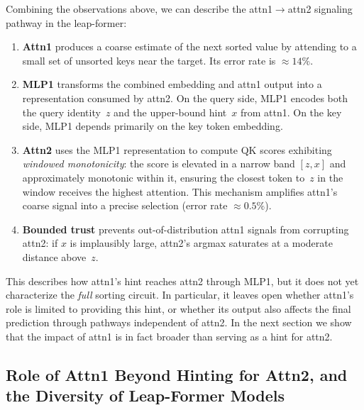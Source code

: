 Combining the observations above, we can describe the attn1$\to$attn2
signaling pathway in the leap-former:
\begin{enumerate}[nosep]
  \item \textbf{Attn1} produces a coarse estimate of the next sorted value by
    attending to a small set of unsorted keys near the target. Its error rate
    is ${\approx}14\%$.
  \item \textbf{MLP1} transforms the combined embedding and attn1 output into
    a representation consumed by attn2. On the query side, MLP1 encodes both
    the query identity~$z$ and the upper-bound hint~$x$ from attn1. On the
    key side, MLP1 depends primarily on the key token embedding.
  \item \textbf{Attn2} uses the MLP1 representation to compute QK scores
    exhibiting \emph{windowed monotonicity}: the score is elevated in a narrow
    band $[z, x]$ and approximately monotonic within it, ensuring the closest
    token to~$z$ in the window receives the highest attention. This mechanism
    amplifies attn1's coarse signal into a precise selection (error rate
    ${\approx}0.5\%$).
  \item \textbf{Bounded trust} prevents out-of-distribution attn1 signals from
    corrupting attn2: if $x$ is implausibly large, attn2's argmax saturates at
    a moderate distance above~$z$.
\end{enumerate}

This describes how attn1's hint reaches attn2 through MLP1, but it does not yet
characterize the \emph{full} sorting circuit. In particular, it leaves open
whether attn1's role is limited to providing this hint, or whether its output
also affects the final prediction through pathways independent of attn2. In the
next section we show that the impact of attn1 is in fact broader than serving as
a hint for attn2.

\subsection{Role of Attn1 Beyond Hinting for Attn2, and the Diversity of Leap-Former Models}

